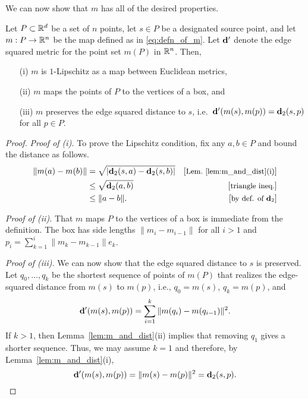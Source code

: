   We can now show that $m$ has all of the desired properties.

  \begin{prop}\label{prop:m_is_good}
    Let $P\subset{\mathbb R}^d$ be a set of $n$ points, let $s\in P$ be a designated source point, and let $m:P\to {\mathbb R}^n$ be the map defined as in \eqref{eq:defn_of_m}.
    Let $\mathbf{d}'$ denote the edge squared metric for the point set $m(P)$ in ${\mathbb R}^n$.
    Then,
    \begin{enumerate}
      \item[(i)] $m$ is $1$-Lipschitz as a map between Euclidean metrics,
      \item[(ii)] $m$ maps the points of $P$ to the vertices of a box, and
      \item[(iii)] $m$ preserves the edge squared distance to $s$, i.e.\ $\mathbf{d}'(m(s), m(p)) = \mathbf{d}_2(s,p)$ for all $p\in P$.
    \end{enumerate}
  \end{prop}
  \begin{proof}
    \emph{Proof of (i).} To prove the Lipschitz condition, fix any $a,b\in P$ and bound the distance as follows.
    \begin{align*}
      \|m(a) - m(b)\|
        &= \sqrt{|\mathbf{d}_2(s,a) - \mathbf{d}_2(s,b)|} &\left[\text{\small{Lem.~\ref{lem:m_and_dist}(i)}}\right]\\
        &\le \sqrt{\mathbf{d}_2(a,b)} &\left[\text{\small{triangle ineq.}}\right]\\
        &\le \|a-b\|. &\left[\text{\small{by def. of $\mathbf{d}_2$}}\right]\\
    \end{align*}

    \noindent
    \emph{Proof of (ii).} That $m$ maps $P$ to the vertices of a box is immediate from the definition.
    The box has side lengths $\|m_i - m_{i-1}\|$ for all $i>1$ and $p_i = \sum_{k=1}^i \|m_k - m_{k-1}\| e_k$.

    \noindent
    \emph{Proof of (iii).} We can now show that the edge squared distance to $s$ is preserved.
    Let $q_0,\ldots, q_k$ be the shortest sequence of points of $m(P)$ that realizes the edge-squared distance from $m(s)$ to $m(p)$, i.e., $q_0 = m(s)$, $q_k = m(p)$, and
    \[
      \mathbf{d}'(m(s), m(p)) = \sum_{i = 1}^k \|m(q_i) - m(q_{i-1})\|^2.
    \]
    If $k> 1$, then Lemma~\ref{lem:m_and_dist}(ii) implies that removing $q_1$ gives a shorter sequence.
    Thus, we may assume $k = 1$ and therefore, by Lemma~\ref{lem:m_and_dist}(i),
    \[
      \dist'(m(s), m(p)) = \|m(s) - m(p)\|^2 = \dist_2(s,p). %
    \]
  \end{proof}



